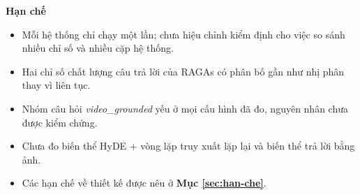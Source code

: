 \bigbreak\noindent
\textbf{Hạn chế}
\begin{itemize}
    \item Mỗi hệ thống chỉ chạy một lần; chưa hiệu chỉnh kiểm định cho việc so sánh nhiều chỉ số và nhiều cặp hệ thống.
    \item Hai chỉ số chất lượng câu trả lời của RAGAs có phân bố gần như nhị phân thay vì liên tục.
    \item Nhóm câu hỏi \textit{video\_grounded} yếu ở mọi cấu hình đã đo, nguyên nhân chưa được kiểm chứng.
    \item Chưa đo biến thể HyDE + vòng lặp truy xuất lặp lại và biến thể trả lời bằng ảnh.
    \item Các hạn chế về thiết kế được nêu ở \textbf{Mục \ref{sec:han-che}}.
\end{itemize}
